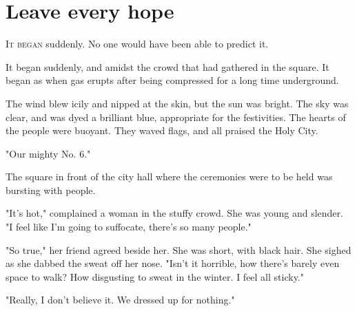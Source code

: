 
\chapter{Leave every hope}


\lettrine{I}{t began} suddenly. No one would have been able to predict it.

It began suddenly, and amidst the crowd that had gathered in the square.
It began as when gas erupts after being compressed for a long time
underground.


The wind blew icily and nipped at the skin, but the sun was bright. The
sky was clear, and was dyed a brilliant blue, appropriate for the
festivities. The hearts of the people were buoyant. They waved flags,
and all praised the Holy City.

"Our mighty No. 6."

The square in front of the city hall where the ceremonies were to be
held was bursting with people.

"It's hot," complained a woman in the stuffy crowd. She was young and
slender. "I feel like I'm going to suffocate, there's so many people."

"So true," her friend agreed beside her. She was short, with black hair.
She sighed as she dabbed the sweat off her nose. "Isn't it horrible, how
there's barely even space to walk? How disgusting to sweat in the
winter. I feel all sticky."

"Really, I don't believe it. We dressed up for nothing."

